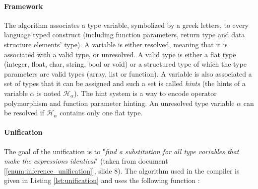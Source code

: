 \documentclass[a4paper,11pt]{article}
\begin{document}
\paragraph{Framework} The algorithm associates a type variable, symbolized by a greek letters, to every language typed construct (including function parameters, return type and data structure elements' type). A variable is either resolved, meaning that it is associated with a valid type, or unresolved. A valid type is either a flat type (integer, float, char, string, bool or void) or a structured type of which the type parameters are valid types (array, list or function). A variable is also associated a set of types that it can be assigned and such a set is called \textit{hints} (the hints of a variable $\alpha$ is noted $\mathcal{H}_\alpha$). The hint system is a way to encode operator polymorphism and function parameter hinting. An unresolved type variable $\alpha$ can be resolved if $\mathcal{H}_\alpha$ contains only one flat type.
\paragraph{Unification} The goal of the unification is to "\textit{find a substitution for all type variables that make the expressions identical}" (taken from document [\ref{enum:inference_unification}], slide 8). The algorithm used in the compiler is given in Listing \ref{lst:unification} and uses the following function :
\end{document}
